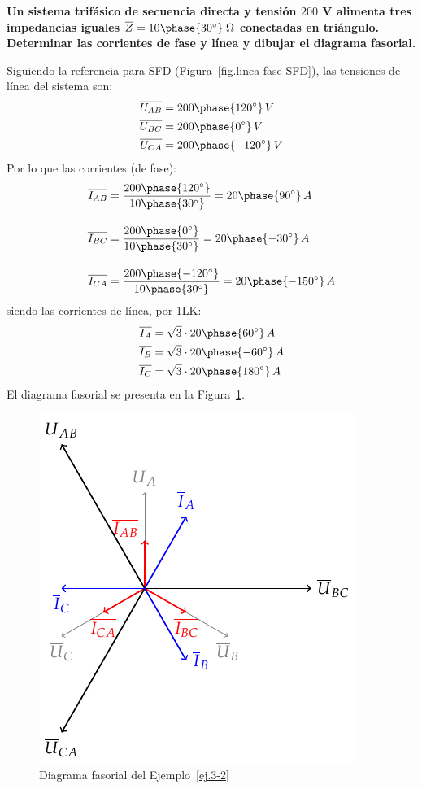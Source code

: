 \documentclass[11pt]{book} %
\begin{document}
	\vspace{4mm}
    \begin{example}\label{ej.3-2}
	    \textbf{Un sistema trifásico de secuencia directa y tensión $200$ V alimenta tres impedancias iguales $\overline{Z}=10\phase{30^\circ}\;\Omega$ conectadas en triángulo. Determinar las corrientes de fase y línea y dibujar el diagrama fasorial.}
	    
	    Siguiendo la referencia para SFD (Figura~\ref{fig.linea-fase-SFD}), las tensiones de línea del sistema son:
	    \begin{align*}
	        \overline{U_{AB}}&=200\phase{120^\circ}\,V\\
	        \overline{U_{BC}}&=200\phase{0^\circ}\,V\\
	        \overline{U_{CA}}&=200\phase{-120^\circ}\,V
	    \end{align*}
	    Por lo que las corrientes (de fase):
	    \begin{align*}
	        \overline{I_{AB}} &= \frac{200\phase{120^\circ}}{10\phase{30^\circ}} =20\phase{90^\circ} \,A \\[10pt]
          \overline{I_{BC}} &= \frac{200\phase{0^\circ}}{10\phase{30^\circ}} = 20\phase{-30^\circ} \,A\\[10pt]
          \overline{I_{CA}} &=\frac{200\phase{-120^\circ}}{10\phase{30^\circ}} = 20\phase{-150^\circ} \,A
	    \end{align*}
	    siendo las corrientes de línea, por 1LK:
	    \begin{align*}
	        \overline{I_A}&=\sqrt{3}\cdot 20\phase{60^\circ}\,A\\
	        \overline{I_B}&=\sqrt{3}\cdot 20\phase{-60^\circ}\,A\\
	        \overline{I_C}&=\sqrt{3}\cdot 20\phase{180^\circ}\,A
	    \end{align*}
	    El diagrama fasorial se presenta en la Figura~\ref{fig.diagrama_ejemplo_3-2}. 
	    \begin{figure}[H]
	        \centering
	    \includegraphics[width=0.4\linewidth]{../figs/diagrama_ejemplo3_2.pdf}
	        \caption{Diagrama fasorial del Ejemplo~\ref{ej.3-2}}
	        \label{fig.diagrama_ejemplo_3-2}
	    \end{figure}
	\end{example}
	
\end{document}
